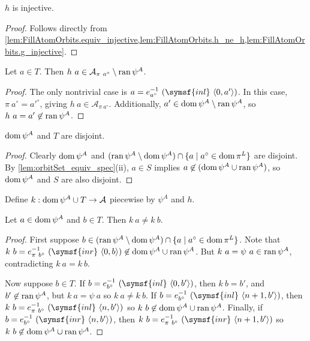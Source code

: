 \begin{lemma}
    \label{lem:FillAtomOrbits.h_injective}
    \( h \) is injective.
\end{lemma}
\begin{proof}
    Follows directly from \cref{lem:FillAtomOrbits.equiv_injective,lem:FillAtomOrbits.h_ne_h,lem:FillAtomOrbits.g_injective}.
\end{proof}
\begin{lemma}
    \label{lem:FillAtomOrbits.h_spec}
    Let \( a \in T \).
    Then \( h\ a \in \mathcal A_{\pi\ a^\circ} \setminus \operatorname{ran} \psi^A \).
\end{lemma}
\begin{proof}
    The only nontrivial case is \( a = e_{a^\circ}^{-1}\ (\symsf{inl}\ \langle 0, a' \rangle) \).
    In this case, \( \pi\ a^\circ = {a'}^\circ \), giving \( h\ a \in \mathcal A_{\pi\ a^\circ} \).
    Additionally, \( a' \in \operatorname{dom} \psi^A \setminus \operatorname{ran} \psi^A \), so \( h\ a = a' \not\in \operatorname{ran} \psi^A \).
\end{proof}
\begin{lemma}
    \( \operatorname{dom} \psi^A \) and \( T \) are disjoint.
\end{lemma}
\begin{proof}
    Clearly \( \operatorname{dom} \psi^A \) and \( (\operatorname{ran} \psi^A \setminus \operatorname{dom} \psi^A) \cap \{ a \mid a^\circ \in \operatorname{dom} \pi^L \} \) are disjoint.
    By \cref{lem:orbitSet_equiv_spec}(ii), \( a \in S \) implies \( a \not\in (\operatorname{dom} \psi^A \cup \operatorname{ran} \psi^A) \), so \( \operatorname{dom} \psi^A \) and \( S \) are also disjoint.
\end{proof}
\begin{definition}
    Define \( k : \operatorname{dom} \psi^A \cup T \to \mathcal A \) piecewise by \( \psi^A \) and \( h \).
\end{definition}
\begin{lemma}
    \label{lem:FillAtomOrbits.k_ne_k}
    Let \( a \in \operatorname{dom} \psi^A \) and \( b \in T \).
    Then \( k\ a \neq k\ b \).
\end{lemma}
\begin{proof}
    First suppose \( b \in (\operatorname{ran} \psi^A \setminus \operatorname{dom} \psi^A) \cap \{ a \mid a^\circ \in \operatorname{dom} \pi^L \} \).
    Note that \( k\ b = e_{\pi\ b^\circ}^{-1}\ (\symsf{inr}\ \langle 0, b \rangle) \not\in \dom \psi^A \cup \ran \psi^A \).
    But \( k\ a = \psi\ a \in \operatorname{ran} \psi^A \), contradicting \( k\ a = k\ b \).

    Now suppose \( b \in T \).
    If \( b = e_{b^\circ}^{-1}\ (\symsf{inl}\ \langle 0, b' \rangle) \), then \( k\ b = b' \), and \( b' \not\in \operatorname{ran} \psi^A \), but \( k\ a = \psi\ a \) so \( k\ a \neq k\ b \).
    If \( b = e_{b^\circ}^{-1}\ (\symsf{inl}\ \langle n + 1, b' \rangle) \), then \( k\ b = e_{\pi\ b^\circ}^{-1}\ (\symsf{inl}\ \langle n, b' \rangle) \) so \( k\ b \not\in \operatorname{dom} \psi^A \cup \operatorname{ran} \psi^A \).
    Finally, if \( b = e_{b^\circ}^{-1}\ (\symsf{inr}\ \langle n, b' \rangle) \), then \( k\ b = e_{\pi\ b^\circ}^{-1}\ (\symsf{inr}\ \langle n + 1, b' \rangle) \) so \( k\ b \not\in \operatorname{dom} \psi^A \cup \operatorname{ran} \psi^A \).
\end{proof}
